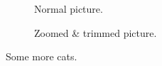 \documentclass[11pt]{article}
\begin{document}
    \begin{figure}
        \centering
        \begin{subfigure}[b]{.5\textwidth}
            \centering
            \caption{Normal picture.}
        \end{subfigure}%
        \begin{subfigure}[b]{.5\textwidth}
            \centering
            \caption{Zoomed \& trimmed picture.}
        \end{subfigure}
        \caption{Some more cats.}
        \label{fig:more-cats}
    \end{figure}

\end{document}

